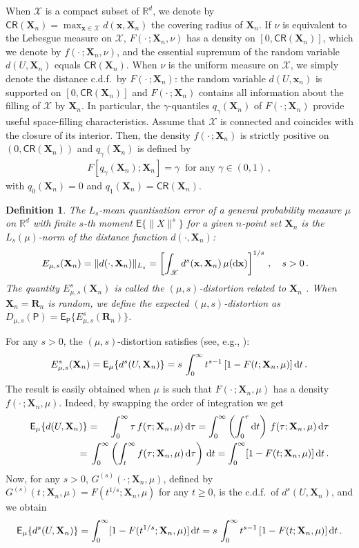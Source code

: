 \documentclass{article}
\def\Px{\mathsf{P}}
\def\RR{\mathds{R}}
\def\SX{{\mathscr X}}
\def\xb{\mathbf{x}}
\def\Xb{\mathbf{X}}
\def\Ex{\mathsf{E}}
\newcommand{\bea}{\begin{eqnarray*}}
\newcommand{\eea}{\end{eqnarray*}}
\newcommand{\be}{\begin{eqnarray}}
\newcommand{\ee}{\end{eqnarray}}
\def\Rb{\mathbf{R}}
\def\CR{\mathsf{CR}}
\def\mg{\gamma}
\def\dd{\mbox{\rm d}}
\newtheorem{definition}{Definition}[section]
\begin{document}
When $\SX$ is a compact subset of $\RR^d$, we denote by $\CR(\Xb_n)= \max_{\xb\in\SX} d(\xb,\Xb_n)$ the covering radius of $\Xb_n$. If $\nu$ is equivalent to the Lebesgue measure on $\SX$, $F(\cdot\,;\Xb_n,\nu)$ has a density on $[0,\CR(\Xb_n)]$, which we denote by $f(\cdot\,;\Xb_n,\nu)$, and the essential supremum of the random variable $d(U,\Xb_n)$ equals $\CR(\Xb_n)$.
When $\nu$ is the uniform measure on $\SX$, we simply denote the distance c.d.f.\ by $F(\cdot\,;\Xb_n)$: the random variable $d(U,\xb_n)$ is supported on $[0,\CR(\Xb_n)]$ and $F(\cdot\,;\Xb_n)$ contains all information about the filling of $\SX$ by $\Xb_n$. In particular, the $\mg$-quantiles $q_\mg(\Xb_n)$ of $F(\cdot\,;\Xb_n)$ provide useful space-filling characteristics. Assume that $\SX$ is connected and coincides with the closure of its interior. Then, the density $f(\cdot\,;\Xb_n)$ is strictly positive on $(0,\CR(\Xb_n))$ and $q_\mg(\Xb_n)$ is defined by
\bea %
F[q_\mg(\Xb_n);\Xb_n]=\mg \ \mbox{ for any }\mg\in(0,1)\,,
\eea
with $q_{0}(\Xb_n)=0$ and $q_{1}(\Xb_n)=\CR(\Xb_n)$.

\begin{definition}\label{D:quantisation-error}
The \emph{$L_s$-mean quantisation error} of a general probability measure $\mu$ on $\RR^d$ with finite $s$-th moment $\Ex\{\|X\|^s\}$ for a given $n$-point set $\Xb_n$ is the $L_s(\mu)$-norm of the distance function $d(\cdot,\Xb_n)$:
\bea %
E_{\mu,s}(\Xb_n) = \|d(\cdot,\Xb_n)\|_{L_s} = \left[\int_\SX d^s(\xb,\Xb_n)\,\mu(\dd\xb)\right]^{1/s}\,, \quad s>0\,.\;\;\;
\eea
The quantity $E_{\mu,s}^s(\Xb_n)$ is called the $(\mu,s)$-distortion related to $\Xb_n$ {\rm \cite{Pages97}}. When $\Xb_n=\Rb_n$ is random, we define the expected $(\mu,s)$-distortion as $D_{\mu,s}(\Px)=\Ex_\Px\{E_{\mu,s}^s(\Rb_n)\}$.
\end{definition}

For any $s>0$, the $(\mu,s)$-distortion satisfies (see, e.g., \cite[p.~150]{Feller71-2}):
\be
E_{\mu,s}^s(\Xb_n) = \Ex_\mu\{d^s(U,\Xb_n)\} = s\, \int_0^\infty t^{s-1}\,[1-F(t;\Xb_n,\mu)] \,\dd t \,. \label{moment-ds-cdf}
\ee
The result is easily obtained when $\mu$ is such that $F(\cdot\,;\Xb_n,\mu)$ has a density $f(\cdot\,;\Xb_n,\mu)$. Indeed, by swapping the order of integration we get
\bea
\Ex_\mu\{d(U,\Xb_n)\} &=& \int_0^\infty \tau\,f(\tau;\Xb_n,\mu)\,\dd \tau = \int_0^\infty \left(\int_0^\tau \dd t\right) \,f(\tau;\Xb_n,\mu)\,\dd \tau \\
&& \hspace{-1cm} = \, \int_0^\infty \left(\int_t^\infty  f(\tau;\Xb_n,\mu)\,\dd \tau\right) \,\dd t = \int_0^\infty [1-F(t;\Xb_n,\mu)] \,\dd t \,.
\eea
Now, for any $s>0$, $G^{(s)}(\cdot\,;\Xb_n,\mu)$, defined by $G^{(s)}(t\,;\Xb_n,\mu)=F(t^{1/s};\Xb_n,\mu)$ for any $t\geq 0$, is the c.d.f.\ of $d^s(U,\Xb_n)$, and we obtain
\bea
\Ex_\mu\{d^s(U,\Xb_n)\} = \int_0^\infty [1-F(t^{1/s};\Xb_n,\mu)] \,\dd t = s\, \int_0^\infty t^{s-1}\,[1-F(t;\Xb_n,\mu)] \,\dd t \,. %
\eea
\end{document}
